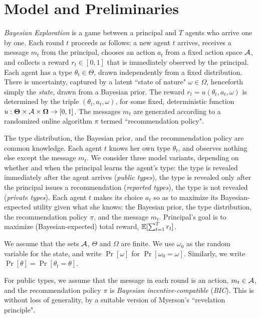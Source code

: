 \section{Model and Preliminaries}

\emph{Bayesian Exploration} is a game between a principal and $T$ agents who arrive one by one. Each round $t$ proceeds as follows: a new agent $t$ arrives, receives a message $m_t$ from the principal, chooses an action $a_t$ from a fixed action space $\mathcal{A}$, and collects a reward $r_t\in [0,1]$ that is immediately observed by the principal. Each agent has a type $\theta_t\in\varTheta$, drawn independently from a fixed distribution. There is uncertainty, captured by a latent ``state of nature" $\omega\in \varOmega$, henceforth simply the \emph{state}, drawn from a Bayesian prior. The reward $r_t = u(\theta_t,a_t,\omega)$ is determined by the triple $(\theta_t,a_t,\omega)$, for some fixed, deterministic function
    $u:\bold{\Theta}\times \mathcal{A} \times \bold{\Omega} \to [0,1]$.
The messages $m_t$ are generated according to a randomized online algorithm $\pi$ termed ``recommendation policy".

The type distribution, the Bayesian prior, and the recommendation policy are common knowledge. Each agent $t$ knows her own type $\theta_t$, and observes nothing else except the message $m_t$.  We consider three model variants, depending on whether and when the principal learns the agent's type: the type is revealed immediately after the agent arrives (\emph{public types}), the type is revealed only after the principal issues a recommendation (\emph{reported types}), the type is not revealed (\emph{private types}). Each agent $t$ makes its choice $a_t$ so as to maximize its Bayesian-expected utility given what she knows: the Bayesian prior, the type distribution, the recommendation policy $\pi$, and the message $m_t$. Principal's goal is to maximize (Bayesian-expected) total reward, \ie $\mathbb{E}[\sum_{t=1}^T r_t]$.

We assume that the sets $\mathcal{A}$, $\varTheta$ and $\varOmega$ are finite. We use $\omega_0$ as the random variable for the state, and write $\Pr[\omega]$ for $\Pr[\omega_0=\omega]$. Similarly, we write $\Pr[\theta]=\Pr[\theta_t=\theta]$.

For public types, we assume that the message in each round is an action, \ie $m_t \in \mathcal{A}$, and the recommendation policy $\pi$ is {\em Bayesian incentive-compatible} (\emph{BIC}). This is without loss of generality, by a suitable version of Myerson's ``revelation principle".

